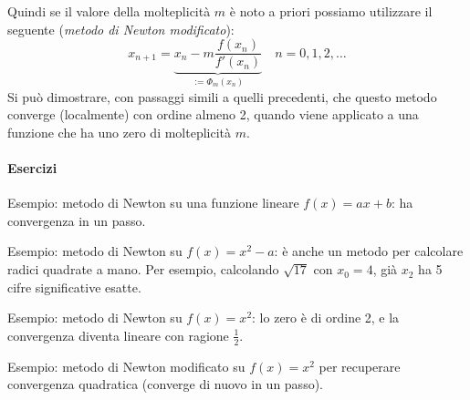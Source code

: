 \documentclass[a4paper]{report}
\theoremstyle{definiton}
\theoremstyle{remark}
\begin{document}
Quindi se il valore della molteplicità $m$ è noto a priori possiamo utilizzare il seguente (\emph{metodo di Newton modificato}):
\begin{equation} \label{newtonmod}
    x_{n+1} = \underbrace{x_n - m\frac{f(x_n)}{f'(x_n)}}_{:=\Phi_m(x_n)} \quad n = 0,1,2,\dots    
\end{equation}
Si può dimostrare, con passaggi simili a quelli precedenti, che questo metodo converge (localmente) con ordine almeno 2, quando viene applicato a una funzione che ha uno zero di molteplicità $m$.

\paragraph{Esercizi}

Esempio: metodo di Newton su una funzione lineare $f(x) = a x + b$: ha convergenza in un passo.

Esempio: metodo di Newton su $f(x) = x^2-a$: è anche un metodo per calcolare radici quadrate a mano. Per esempio, calcolando $\sqrt{17}$ con $x_0 = 4$, già $x_2$ ha 5 cifre significative esatte.

Esempio: metodo di Newton su $f(x) = x^2$: lo zero è di ordine 2, e la convergenza diventa lineare con ragione $\frac12$.

Esempio: metodo di Newton modificato su $f(x) = x^2$ per recuperare convergenza quadratica (converge di nuovo in un passo).
\end{document}
